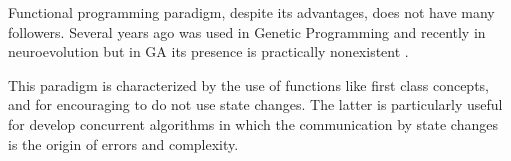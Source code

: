 
Functional programming paradigm, despite its advantages, does not have many followers. Several years ago was used in Genetic Programming \cite{Briggs:2008:FGP:1375341.1375345,Huelsbergen:1996:TSE:1595536.1595579,walsh:1999:AFSFESIHLP} and recently in neuroevolution \cite{Sher2013} but in GA its presence is practically nonexistent \cite{Hawkins:2001:GFG:872017.872197}.

This paradigm is characterized by the use of functions like first class concepts, and for encouraging to do not use state changes. The latter is particularly useful for develop concurrent algorithms in which the communication by state changes is the origin of errors and complexity.